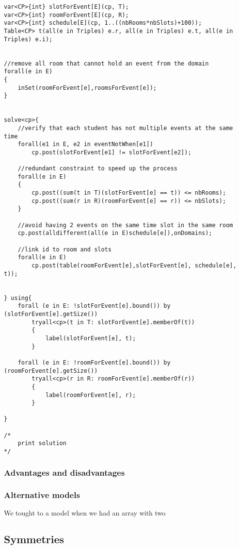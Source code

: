 \documentclass{eplDoc}
\begin{document}
\begin{lstlisting}
var<CP>{int} slotForEvent[E](cp, T);
var<CP>{int} roomForEvent[E](cp, R);
var<CP>{int} schedule[E](cp, 1..((nbRooms*nbSlots)+100));
Table<CP> t(all(e in Triples) e.r, all(e in Triples) e.t, all(e in Triples) e.i);


//remove all room that cannot hold an event from the domain
forall(e in E)
{
    inSet(roomForEvent[e],roomsForEvent[e]);
}


solve<cp>{
    //verify that each student has not multiple events at the same time
    forall(e1 in E, e2 in eventNotWhen[e1])
        cp.post(slotForEvent[e1] != slotForEvent[e2]);

    //redundant constraint to speed up the process
    forall(e in E)
    {
        cp.post((sum(t in T)(slotForEvent[e] == t)) <= nbRooms);
        cp.post((sum(r in R)(roomForEvent[e] == r)) <= nbSlots);
    }

    //avoid having 2 events on the same time slot in the same room
    cp.post(alldifferent(all(e in E)schedule[e]),onDomains);

    //link id to room and slots
    forall(e in E)
        cp.post(table(roomForEvent[e],slotForEvent[e], schedule[e], t));


} using{
    forall (e in E: !slotForEvent[e].bound()) by (slotForEvent[e].getSize())
        tryall<cp>(t in T: slotForEvent[e].memberOf(t))
        {
            label(slotForEvent[e], t);
        }
    
    forall (e in E: !roomForEvent[e].bound()) by (roomForEvent[e].getSize())
        tryall<cp>(r in R: roomForEvent[e].memberOf(r))
        {
            label(roomForEvent[e], r);
        }
    
}

/*
    print solution
*/
\end{lstlisting}

\subsubsection{Advantages and disadvantages}
\subsubsection{Alternative models}
We tought to a model when we had an array with two 

\subsection{Symmetries}
\end{document}
